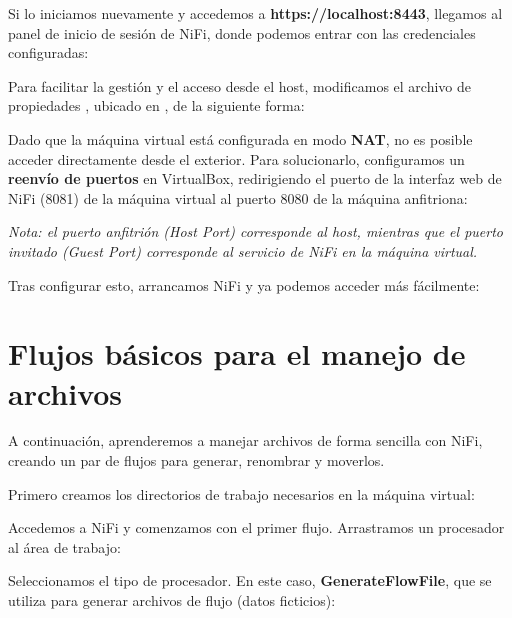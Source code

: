\documentclass{../../../miPlantilla}
\begin{document}
Si lo iniciamos nuevamente y accedemos a \textbf{https://localhost:8443}, llegamos al panel de inicio de sesión de NiFi, donde podemos entrar con las credenciales configuradas:


\newpage

Para facilitar la gestión y el acceso desde el host, modificamos el archivo de propiedades , ubicado en , de la siguiente forma:


Dado que la máquina virtual está configurada en modo \textbf{NAT}, no es posible acceder directamente desde el exterior. Para solucionarlo, configuramos un \textbf{reenvío de puertos} en VirtualBox, redirigiendo el puerto de la interfaz web de NiFi (8081) de la máquina virtual al puerto 8080 de la máquina anfitriona:


\textit{Nota: el puerto anfitrión (\textit{Host Port}) corresponde al host, mientras que el puerto invitado (\textit{Guest Port}) corresponde al servicio de NiFi en la máquina virtual.}

\newpage

Tras configurar esto, arrancamos NiFi y ya podemos acceder más fácilmente:


\newpage

\section{Flujos básicos para el manejo de archivos}
A continuación, aprenderemos a manejar archivos de forma sencilla con NiFi, creando un par de flujos para generar, renombrar y moverlos.

Primero creamos los directorios de trabajo necesarios en la máquina virtual:


Accedemos a NiFi y comenzamos con el primer flujo. Arrastramos un procesador al área de trabajo:


Seleccionamos el tipo de procesador. En este caso, \textbf{GenerateFlowFile}, que se utiliza para generar archivos de flujo (datos ficticios):
\end{document}
